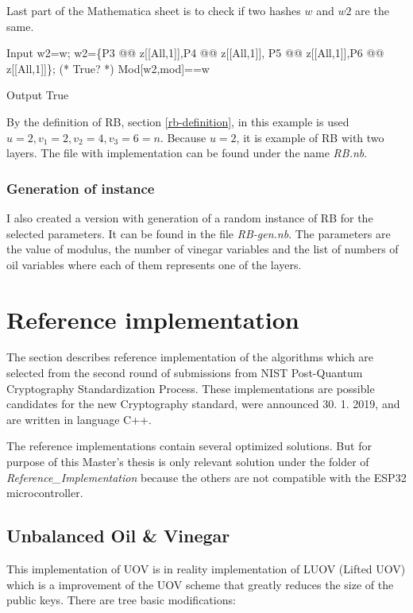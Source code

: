 \documentclass[thesis=M,english]{FITthesis}[2019/12/23]
\begin{document}
\bigskip
\noindent
Last part of the Mathematica sheet is to check if two hashes $w$ and $w2$ are the same.
\begin{mmaCell}[moredefined={w2, w, P5, P6, z, P4, P3, mod}]{Input}
  w2=w;
  w2=\{P3 @@ z[[All,1]],P4 @@ z[[All,1]],
      P5 @@ z[[All,1]],P6 @@ z[[All,1]]\};
  (* True? *)
  Mod[w2,mod]==w
\end{mmaCell}
\begin{mmaCell}[addtoindex=2]{Output}
  True
\end{mmaCell}
By the definition of RB, section \ref{rb-definition}, in this example is used $u=2, v_1=2, v_2=4, v_3=6=n$. Because $u=2$, it is example of RB with two layers.
The file with implementation can be found under the name \textit{RB.nb}.

\subsubsection{Generation of instance}
I also created a version with generation of a random instance of RB for the selected parameters. It can be found in the file \textit{RB-gen.nb}. The parameters are the value of modulus, the number of vinegar variables and the list of numbers of oil variables where each of them represents one of the layers.

\newpage
\lstset{basicstyle=\footnotesize\ttfamily}
\section{Reference implementation}
The section describes reference implementation of the algorithms which are selected from the second round of submissions from NIST Post-Quantum Cryptography Standardization Process.\cite{L-NIST-2ND} These implementations are possible candidates for the new Cryptography standard, were announced 30. 1. 2019, and are written in language C++. 

\bigskip
\noindent
The reference implementations contain several optimized solutions. But for purpose of this Master's thesis is only relevant solution under the folder of \textit{Reference\_Implementation} because the others are not compatible with the ESP32 microcontroller.

\subsection{Unbalanced Oil \& Vinegar}
This implementation of UOV is in reality implementation of LUOV (Lifted UOV) which is a improvement of the UOV scheme that greatly reduces the size of the public keys. There are tree basic modifications:
\end{document}
